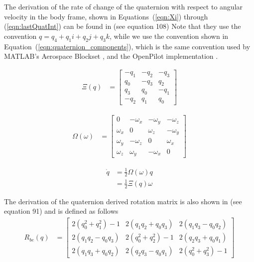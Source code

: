 \documentclass[]{article}
\begin{document}
{The derivation of the rate of change of the quaternion with respect to angular velocity in the body frame, shown in Equations~(\ref{eqn:Xi}) through (\ref{eqn:lastQuatInt}) can be found in \cite{MARSlab} (see equation 108)
Note that they use the convention $q = q_4 + q_1i + q_2j + q_3k$, while we use the convention shown in Equation~(\ref{eqn:quaternion_components}), which is the same convention used by MATLAB's Aerospace Blockset \cite{MATLABAerospace}, and the OpenPilot implementation \cite{OpenPilotPaper}.


\begin{align}
	\label{eqn:Xi}
	\Xi(q) &=
	\left[
	\begin{matrix}
		-q_1 	& -q_2	& -q_3 	\\
		q_0		& -q_3 	& q_2 	\\
		q_3 	& q_0 	& -q_1 	\\
		-q_2 	& q_1 	& q_0
	\end{matrix}
	\right]
\end{align}

\begin{align}
	\label{eqn:Omega}
	\Omega(\omega) &=
	\left[
	\begin{matrix}
		0 			& -\omega_x 	& -\omega_y	& -\omega_z	\\
		\omega_x 	& 0 			& \omega_z 	& -\omega_y \\
		\omega_y 	& -\omega_z 	& 0 		& \omega_x 	\\
		\omega_z 	& \omega_y		& -\omega_x & 0
	\end{matrix}
	\right]
\end{align}

\begin{align}
	\dot{q} 	&= \frac{1}{2} \Omega(\omega) q \\
	\label{eqn:lastQuatInt}
				&= \frac{1}{2} \Xi(q) \omega
\end{align}

The derivation of the quaternion derived rotation matrix is also shown in \cite{MARSlab} (see equation 91) and is defined as follows
\begin{align}
	R_{be}(q) &=
	\left[
	\begin{matrix}
		2(q_0^2 + q_1^2) - 1 	& 2(q_1 q_2 + q_0 q_3) 	& 2(q_1 q_3 - q_0 q_2) \\
		2(q_1 q_2 - q_0 q_3) 	& 2(q_0^2 + q_2^2) - 1 	& 2(q_2 q_3 + q_0 q_1) \\
		2(q_1 q_3 + q_0 q_2)	& 2(q_2 q_3 - q_0 q_1)	& 2(q_0^2 + q_3^2) - 1
	\end{matrix}
	\right]
\end{align}

}
\end{document}
